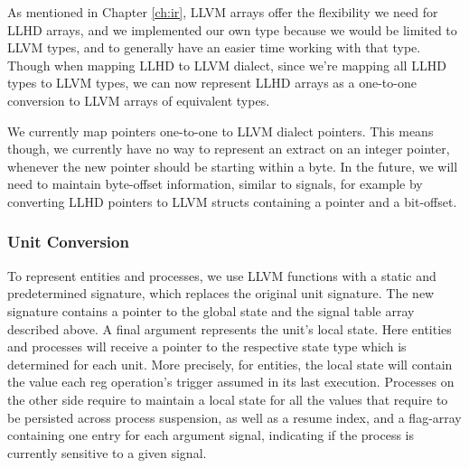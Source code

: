 
As mentioned in Chapter \ref{ch:ir}, LLVM arrays offer the flexibility we need for LLHD arrays, and we implemented our own type because we would be limited to LLVM types, and to generally have an easier time working with that type. Though when mapping LLHD to LLVM dialect, since we're mapping all LLHD types to LLVM types, we can now represent LLHD arrays as a one-to-one conversion to LLVM arrays of equivalent types.

We currently map pointers one-to-one to LLVM dialect pointers. This means though, we currently have no way to represent an extract on an integer pointer, whenever the new pointer should be starting within a byte. In the future, we will need to maintain byte-offset information, similar to signals, for example by converting LLHD pointers to LLVM structs containing a pointer and a bit-offset.


\subsubsection{Unit Conversion}
To represent entities and processes, we use LLVM functions with a static and predetermined signature, which replaces the original unit signature. The new signature contains a pointer to the global state and the signal table array described above. A final argument represents the unit's local state. Here entities and processes will receive a pointer to the respective state type which is determined for each unit. More precisely, for entities, the local state will contain the value each reg operation's trigger assumed in its last execution. Processes on the other side require to maintain a local state for all the values that require to be persisted across process suspension, as well as a resume index, and a flag-array containing one entry for each argument signal, indicating if the process is currently sensitive to a given signal.

